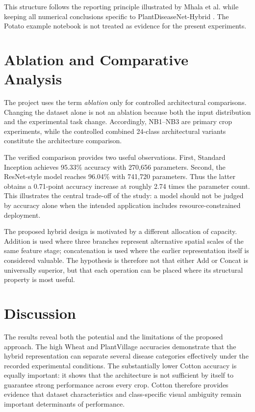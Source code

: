 \documentclass[a4paper,fleqn]{cas-dc}
\begin{document}
This structure follows the reporting principle illustrated by Mhala et al. while keeping all numerical conclusions specific to PlantDiseaseNet-Hybrid \citep{mhalap2025}. The Potato example notebook is not treated as evidence for the present experiments.

\section{Ablation and Comparative Analysis}
The project uses the term \emph{ablation} only for controlled architectural comparisons. Changing the dataset alone is not an ablation because both the input distribution and the experimental task change. Accordingly, NB1--NB3 are primary crop experiments, while the controlled combined 24-class architectural variants constitute the architecture comparison.

The verified comparison provides two useful observations. First, Standard Inception achieves 95.33\% accuracy with 270,656 parameters. Second, the ResNet-style model reaches 96.04\% with 741,720 parameters. Thus the latter obtains a 0.71-point accuracy increase at roughly 2.74 times the parameter count. This illustrates the central trade-off of the study: a model should not be judged by accuracy alone when the intended application includes resource-constrained deployment.

The proposed hybrid design is motivated by a different allocation of capacity. Addition is used where three branches represent alternative spatial scales of the same feature stage; concatenation is used where the earlier representation itself is considered valuable. The hypothesis is therefore not that either Add or Concat is universally superior, but that each operation can be placed where its structural property is most useful.

\section{Discussion}
The results reveal both the potential and the limitations of the proposed approach. The high Wheat and PlantVillage accuracies demonstrate that the hybrid representation can separate several disease categories effectively under the recorded experimental conditions. The substantially lower Cotton accuracy is equally important: it shows that the architecture is not sufficient by itself to guarantee strong performance across every crop. Cotton therefore provides evidence that dataset characteristics and class-specific visual ambiguity remain important determinants of performance.
\end{document}
